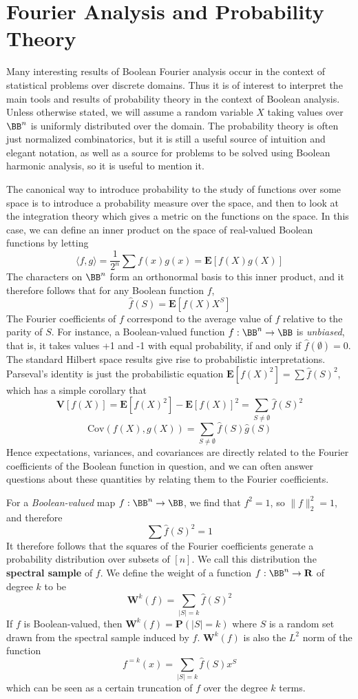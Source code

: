 \section{Fourier Analysis and Probability Theory}

Many interesting results of Boolean Fourier analysis occur in the context of statistical problems over discrete domains. Thus it is of interest to interpret the main tools and results of probability theory in the context of Boolean analysis. Unless otherwise stated, we will assume a random variable $X$ taking values over $\BB^n$ is uniformly distributed over the domain. The probability theory is often just normalized combinatorics, but it is still a useful source of intuition and elegant notation, as well as a source for problems to be solved using Boolean harmonic analysis, so it is useful to mention it.

The canonical way to introduce probability to the study of functions over some space is to introduce a probability measure over the space, and then to look at the integration theory which gives a metric on the functions on the space. In this case, we can define an inner product on the space of real-valued Boolean functions by letting
%
\[ \langle f, g \rangle = \frac{1}{2^n} \sum f(x)g(x) = \mathbf{E}[f(X)g(X)] \]
%
The characters on $\BB^n$ form an orthonormal basis to this inner product, and it therefore follows that for any Boolean function $f$,
%
\[ \widehat{f}(S) = \mathbf{E}[f(X)X^S] \]
%
The Fourier coefficients of $f$ correspond to the average value of $f$ relative to the parity of $S$. For instance, a Boolean-valued function $f: \BB^n \to \BB$ is {\it unbiased}, that is, it takes values +1 and -1 with equal probability, if and only if $\widehat{f}(\emptyset) = 0$. The standard Hilbert space results give rise to probabilistic interpretations. Parseval's identity is just the probabilistic equation $\mathbf{E}[f(X)^2] = \sum \widehat{f}(S)^2$, which has a simple corollary that
%
\[ \mathbf{V}[f(X)] = \mathbf{E}[f(X)^2] - \mathbf{E}[f(X)]^2 = \sum_{S \neq \emptyset} \widehat{f}(S)^2 \]
%
\[ \text{Cov}(f(X),g(X)) = \sum_{S \neq \emptyset} \widehat{f}(S) \widehat{g}(S) \]
%
Hence expectations, variances, and covariances are directly related to the Fourier coefficients of the Boolean function in question, and we can often answer questions about these quantities by relating them to the Fourier coefficients.

For a {\it Boolean-valued} map $f: \BB^n \to \BB$, we find that $f^2 = 1$, so $\| f \|_2^2 = 1$, and therefore
%
\[ \sum \widehat{f}(S)^2 = 1 \]
%
It therefore follows that the squares of the Fourier coefficients generate a probability distribution over subsets of $[n]$. We call this distribution the {\bf spectral sample} of $f$. We define the weight of a function $f: \BB^n \to \mathbf{R}$ of degree $k$ to be
%
\[ \mathbf{W}^k(f) = \sum_{|S| = k} \widehat{f}(S)^2 \]
%
If $f$ is Boolean-valued, then $\mathbf{W}^k(f) = \mathbf{P}(|S| = k)$ where $S$ is a random set drawn from the spectral sample induced by $f$. $\mathbf{W}^k(f)$ is also the $L^2$ norm of the function
%
\[ f^{=k}(x) = \sum_{|S| = k} \widehat{f}(S) x^S \]
%
which can be seen as a certain truncation of $f$ over the degree $k$ terms.


